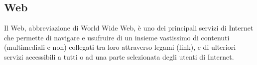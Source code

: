 \documentclass[a4paper, titlepage]{article}
\begin{document}
 	 \subsection{Web}
 	 Il Web, abbreviazione di World Wide Web, è uno dei principali servizi di Internet che permette di
 	 navigare e usufruire di un insieme vastissimo di contenuti (multimediali e non) collegati tra loro
 	 attraverso legami (link), e di ulteriori servizi accessibili a tutti o ad una parte selezionata degli
 	 utenti di Internet.
 	 
	
\end{document}
